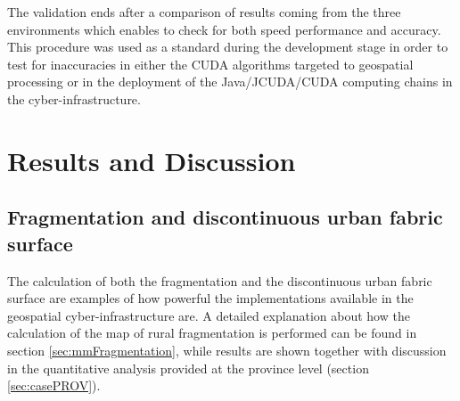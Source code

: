 \documentclass[APA,LATO1COL,doublespace]{WileyNJD-v2}
\newcommand{\toberevised}[1]{\emph{\textcolor{red}{#1}}} %
\begin{document}
The validation ends after a comparison of results coming from the three environments which enables to check for both speed performance and accuracy. 
This procedure was used as a standard during the development stage in order to test for inaccuracies in either the CUDA algorithms targeted to geospatial processing or in the deployment of the Java/JCUDA/CUDA computing chains in the cyber-infrastructure.

\section{ Results and Discussion } %
\label{sec:results}





\subsection{ Fragmentation and discontinuous urban fabric surface }
\label{sec:resFRAG_DUF}
The calculation of both the fragmentation and the discontinuous urban fabric surface are examples of how powerful the implementations available in the geospatial cyber-infrastructure are.
A detailed explanation about how the calculation of the map of rural fragmentation is performed can be found in section \ref{sec:mmFragmentation}, while results are shown
 together with discussion
in the quantitative analysis provided at the province level (section \ref{sec:casePROV}).%
\end{document}
